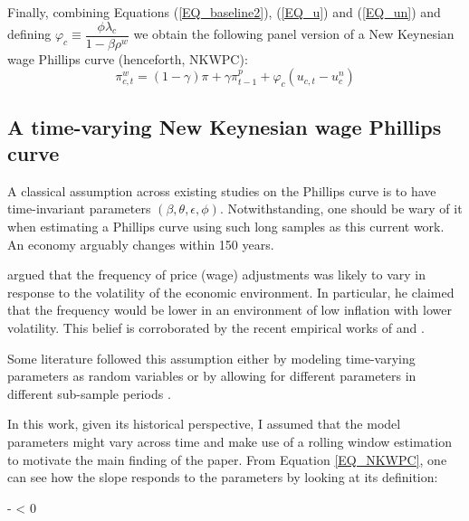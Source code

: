 \documentclass[12pt]{article}
\begin{document}
\begin{appendices}
Finally, combining Equations (\ref{EQ_baseline2}), (\ref{EQ_u}) and (\ref{EQ_un}) and defining $\varphi_c \equiv \dfrac{\phi \lambda_c}{1 - \beta \rho^w}$ we obtain the following panel version of a New Keynesian wage Phillips curve (henceforth, NKWPC):
\begin{equation}
    \label{EQ_NKWPC}
    \pi_{c,t}^{w} = (1-\gamma)\pi + \gamma \pi^p_{t-1} + \varphi_c (u_{c,t} - u_c^n)
\end{equation}

\subsection{A time-varying New Keynesian wage Phillips curve \label{SS_FPA}}

A classical assumption across existing studies on the Phillips curve is to have time-invariant parameters $(\beta, \theta, \epsilon, \phi)$. Notwithstanding, one should be wary of it when estimating a Phillips curve using such long samples as this current work. An economy arguably changes within 150 years. 

\cite{Romer1990} argued that the frequency of price (wage) adjustments was likely to vary in response to the volatility of the economic environment. In particular, he claimed that the frequency would be lower in an environment of low inflation with lower volatility. This belief is corroborated by the recent empirical works of \cite{Gagnon2009} and \cite{Nakamura2018}. 

Some literature followed this assumption either by modeling time-varying parameters as random variables \citep{Romer1990, Primiceri2005} or by allowing for different parameters in different sub-sample periods \citep{Gali1999, Smets2007}.

In this work, given its historical perspective, I assumed that the model parameters might vary across time and make use of a rolling window estimation to motivate the main finding of the paper. From Equation \eqref{EQ_NKWPC}, one can see how the slope responds to the parameters by looking at its definition:
\begin{Equation*}
    \varphi \equiv -  < 0   
\end{Equation*}


\end{appendices}
\end{document}
